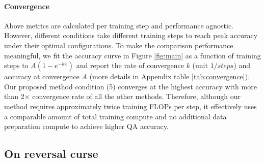 \paragraph{Convergence} Above metrics are calculated per training step and performance agnostic. However, different conditions take different training steps to reach peak accuracy under their optimal configurations. To make the comparison performance meaningful, we fit the accuracy curve in Figure \ref{fig:main} as a function of training steps to $A(1-e^{-kx})$ and report the rate of convergence $k$ (unit $1/steps$) and accuracy at convergence $A$ (more details in Appendix table \ref{tab:convergence}). Our proposed method condition (5) converges at the highest accuracy with more than 2$\times$ convergence rate of all the other methods. Therefore, although our method requires approximately twice training FLOPs per step, it effectively uses a comparable amount of total training compute and no additional data preparation compute to achieve higher QA accuracy. 


\subsection{On reversal curse}

\label{app:reversal}

